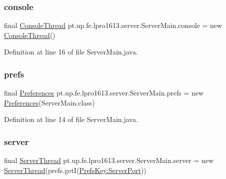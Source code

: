 \subsubsection{\texorpdfstring{console}{console}}
{\footnotesize\ttfamily final \hyperlink{classpt_1_1up_1_1fe_1_1lpro1613_1_1server_1_1other_1_1_console_thread}{Console\+Thread} pt.\+up.\+fe.\+lpro1613.\+server.\+Server\+Main.\+console = new \hyperlink{classpt_1_1up_1_1fe_1_1lpro1613_1_1server_1_1other_1_1_console_thread}{Console\+Thread}()\hspace{0.3cm}{\ttfamily [static]}}



Definition at line 16 of file Server\+Main.\+java.

\hypertarget{classpt_1_1up_1_1fe_1_1lpro1613_1_1server_1_1_server_main_af70c93d4f50a3f81c9edb159095f6b1c}{}\label{classpt_1_1up_1_1fe_1_1lpro1613_1_1server_1_1_server_main_af70c93d4f50a3f81c9edb159095f6b1c} 
\subsubsection{\texorpdfstring{prefs}{prefs}}
{\footnotesize\ttfamily final \hyperlink{classpt_1_1up_1_1fe_1_1lpro1613_1_1sharedlib_1_1utils_1_1_preferences}{Preferences} pt.\+up.\+fe.\+lpro1613.\+server.\+Server\+Main.\+prefs = new \hyperlink{classpt_1_1up_1_1fe_1_1lpro1613_1_1sharedlib_1_1utils_1_1_preferences}{Preferences}(Server\+Main.\+class)\hspace{0.3cm}{\ttfamily [static]}}



Definition at line 14 of file Server\+Main.\+java.

\hypertarget{classpt_1_1up_1_1fe_1_1lpro1613_1_1server_1_1_server_main_a47b0d3f323dca42ff790cf040be6ce3a}{}\label{classpt_1_1up_1_1fe_1_1lpro1613_1_1server_1_1_server_main_a47b0d3f323dca42ff790cf040be6ce3a} 
\subsubsection{\texorpdfstring{server}{server}}
{\footnotesize\ttfamily final \hyperlink{classpt_1_1up_1_1fe_1_1lpro1613_1_1server_1_1conn_1_1_server_thread}{Server\+Thread} pt.\+up.\+fe.\+lpro1613.\+server.\+Server\+Main.\+server = new \hyperlink{classpt_1_1up_1_1fe_1_1lpro1613_1_1server_1_1conn_1_1_server_thread}{Server\+Thread}(prefs.\+getI(\hyperlink{enumpt_1_1up_1_1fe_1_1lpro1613_1_1server_1_1other_1_1_prefs_key_a92ee06ea77e828cd8272275f9309e142}{Prefs\+Key.\+Server\+Port}))\hspace{0.3cm}{\ttfamily [static]}}



